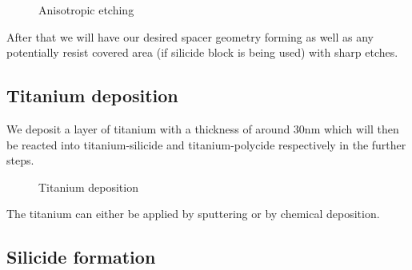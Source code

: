 \begin{figure}[H]
	\centering
	\begin{tikzpicture}[node distance = 3cm, auto, thick,scale=\CrossSectionOnly, every node/.style={transform shape}]
		
	\end{tikzpicture}
	\begin{tikzpicture}[node distance = 3cm, auto, thick,scale=\CrossSectionOnly, every node/.style={transform shape}]
		
	\end{tikzpicture}
	\caption{Anisotropic etching}
\end{figure}

After that we will have our desired spacer geometry forming as well as any potentially resist covered area (if silicide block is being used) with sharp etches.

\subsection{Titanium deposition}

We deposit a layer of titanium with a thickness of around 30nm which will then be reacted into titanium-silicide and titanium-polycide respectively in the further steps.

\begin{figure}[H]
	\centering
	\begin{tikzpicture}[node distance = 3cm, auto, thick,scale=\CrossSectionOnly, every node/.style={transform shape}]
		
	\end{tikzpicture}
	\drawStepArrow{}
	\begin{tikzpicture}[node distance = 3cm, auto, thick,scale=\CrossSectionOnly, every node/.style={transform shape}]
		
	\end{tikzpicture}
	\caption{Titanium deposition}
\end{figure}

The titanium can either be applied by sputtering or by chemical deposition.

\newpage

\subsection{Silicide formation}

